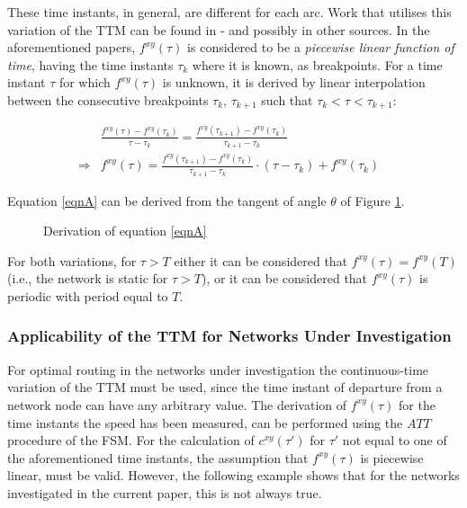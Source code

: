 \documentclass[conference]{IEEEtran}
\begin{document}
These time instants, in general, are different for each arc. Work that utilises this variation of the TTM can be found in \cite{Delling}-\cite{Batz} and possibly in other sources. In the aforementioned papers, $f^{xy}(\tau)$ is considered to be a \emph{piecewise linear function of time}, having the time instants $\tau_k$ where it is known, as breakpoints. For a time instant $\tau$ for which $f^{xy}(\tau)$ is unknown, it is derived by linear interpolation between the consecutive breakpoints $\tau_{k}$, $\tau_{k+1}$ such that $\tau_{k}<\tau<\tau_{k+1}$:

\begin{eqnarray}
&\frac{f^{xy}(\tau)-f^{xy}(\tau_k)}{\tau-\tau_k}=\frac{f^{xy}(\tau_{k+1})-f^{xy}(\tau_k)}{\tau_{k+1}-\tau_k}&  \label{eqnA} \\
\Rightarrow &f^{xy}(\tau)=\frac{f^{xy}(\tau_{k+1})-f^{xy}(\tau_k)}{\tau_{k+1}-\tau_k}\cdot (\tau-\tau_k)+f^{xy}(\tau_k)& \label{eqnB}
\end{eqnarray}

Equation \ref{eqnA} can be derived from the tangent of angle $\theta$ of Figure \ref{fig2}. 

\begin{figure}
\caption{Derivation of equation \ref{eqnA}} \label{fig2}
\end{figure}

For both variations,  for $\tau>T$ either it can be considered that $f^{xy}(\tau)=f^{xy}(T)$ (i.e., the network is static for $\tau>T$), or it can be considered that $f^{xy}(\tau)$ is periodic with period equal to $T$. 

\subsubsection{Applicability of the TTM for Networks Under Investigation} \label{nonlinear}

For optimal routing in the networks under investigation the continuous-time variation of the TTM must be used, since the time instant of departure from a network node can have any arbitrary value.  The derivation of $f^{xy}(\tau)$ for the time instants the speed has been measured, can be performed using the $ATT$ procedure of the FSM. For the calculation of $c^{xy}(\tau')$ for $\tau'$ not equal to one of the aforementioned time instants, the  assumption that $f^{xy}(\tau)$ is piecewise linear, must be valid. However, the following example shows that for the networks investigated in the current paper, this is not always true.
\end{document}
